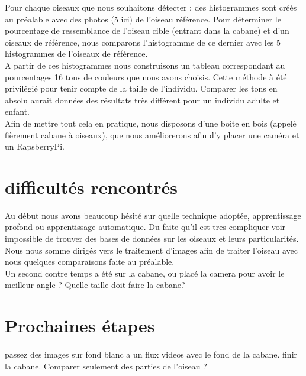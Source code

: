 \documentclass{article}
\begin{document}
Pour chaque oiseaux que nous souhaitons détecter : des histogrammes sont créés au préalable avec des photos (5 ici) de l'oiseau référence.
Pour déterminer le pourcentage de ressemblance de l'oiseau cible (entrant dans la cabane) et d'un oiseaux de référence, nous comparons l'histogramme de ce dernier avec les 5 histogrammes de l'oiseaux de référence. \\

A partir de ces histogrammes nous construisons un tableau correspondant au pourcentages 16 tons de couleurs que nous avons choisis.
Cette méthode à été privilégié pour tenir compte de la taille de l'individu.
Comparer les tons en absolu aurait données des résultats très différent pour un individu adulte et enfant. \\

Afin de mettre tout cela en pratique, nous disposons d'une boite en bois  (appelé fièrement cabane à oiseaux), que nous améliorerons afin d'y placer une caméra et un RapsberryPi.
\section{difficultés rencontrés}
Au début nous avons beaucoup hésité sur quelle technique adoptée, apprentissage profond ou apprentissage automatique. Du faite qu'il est tres compliquer voir  impossible de trouver des bases de données sur les oiseaux et leurs particularités. Nous nous somme dirigés vers le traitement d'images afin de traiter l'oiseau avec nous quelques comparaisons faite au préalable. \\
Un second contre temps a été sur la cabane, ou placé la camera pour avoir le meilleur angle ? Quelle taille doit faire la cabane? 
\section{Prochaines étapes}
\paragraph{}
passez des images sur fond blanc a un flux videos avec le fond de la cabane. finir la cabane. Comparer seulement des parties de l'oiseau ? 
\end{document}
